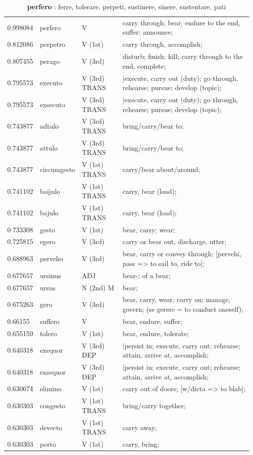\documentclass[]{article}
\begin{document}
	\begin{table}
	\caption{\textbf{perfero} : ferre, tolerare, perpeti, sustinere, sinere, sustentare, pati \label{perfero}}
	\vspace{.25in}
	\begin{tabular}{l|lll}
	   0.998084 & perfero & V & carry through; bear, endure to the end, suffer; announce;\\
	   0.812086 & perpetro & V (1st) & carry through, accomplish;\\
	   0.807455 & perago & V (3rd) & disturb; finish; kill; carry through to the end, complete;\\
	   0.795573 & executo & V (3rd) TRANS & |execute, carry out (duty); go through, rehearse; pursue; develop (topic);\\
	   0.795573 & exsecuto & V (3rd) TRANS & |execute, carry out (duty); go through, rehearse; pursue; develop (topic);\\
	   0.743877 & adtulo & V (3rd) TRANS & bring/carry/bear to;\\
	   0.743877 & attulo & V (3rd) TRANS & bring/carry/bear to;\\
	   0.743877 & circumgesto & V (1st) TRANS & carry/bear about/around;\\
	   0.741102 & baijulo & V (1st) TRANS & carry, bear (load);\\
	   0.741102 & bajulo & V (1st) TRANS & carry, bear (load);\\
	   0.733308 & gesto & V (1st) & bear, carry; wear;\\
	   0.725815 & egero & V (3rd) & carry or bear out, discharge, utter;\\
	   0.688963 & perveho & V (3rd) & bear, carry or convey through; [pervehi, pass =>  to sail to, ride to];\\
	   0.677657 & ursinus & ADJ & bear-; of a bear;\\
	   0.677657 & ursus & N (2nd) M & bear;\\
	   0.675263 & gero & V (3rd) & bear, carry, wear; carry on; manage, govern; (se gerere = to conduct oneself);\\
	   0.66155 & suffero & V & bear, endure, suffer;\\
	   0.655159 & tolero & V (1st) & bear, endure, tolerate;\\
	   0.640318 & exequor & V (3rd) DEP & |persist in; execute, carry out; rehearse; attain, arrive at, accomplish;\\
	   0.640318 & exsequor & V (3rd) DEP & |persist in; execute, carry out; rehearse; attain, arrive at, accomplish;\\
	   0.630674 & elimino & V (1st) & carry out of doors; [w/dicta => to blab];\\
	   0.630303 & congesto & V (1st) TRANS & bring/carry together;\\
	   0.630303 & devecto & V (1st) TRANS & carry away;\\
	   0.630303 & porto & V (1st) & carry, bring;\\
	\end{tabular}
	\end{table}
\end{document}
